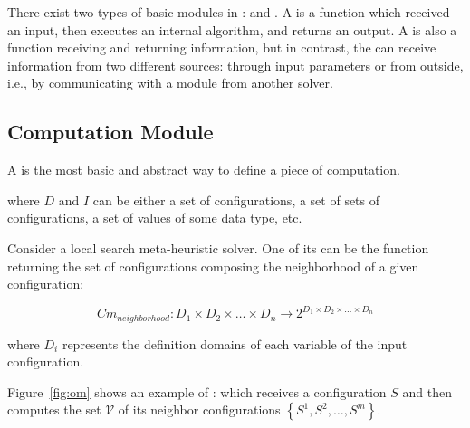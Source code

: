 There exist two types of basic modules in \posl: \oms{} and \opchs{}. A \om{} is a function which received an input, then executes an internal algorithm, and returns an output. A \opch{} is also a function receiving and returning information, but in contrast, the \opch{} can receive information from two different sources: through input parameters or from outside, i.e., by communicating with a module from another solver.

\subsection{Computation Module}


A \om{} is the most basic and abstract way to define a piece of computation. 


where $D$ and $I$ can be either a set of configurations, a set of sets of configurations, a set of values of some data type, etc.

Consider a local search meta-heuristic solver. One of its \oms{} can be the function returning the set of configurations composing the neighborhood of a given configuration:

\begin{equation*}
Cm_{neighborhood}:D_1\times D_2\times\dots\times D_n \rightarrow 2^{D_1\times D_2\times\dots\times D_n}
\end{equation*}

\noindent where $D_i$ represents the definition domains of each variable of the input confi\-gura\-tion.

Figure~\ref{fig:om} shows an example of \om: which receives a configuration $S$ and then computes the set $\mathcal{V}$ of its neighbor configurations $\left\{S^1, S^2, \dots, S^m\right\}$.

